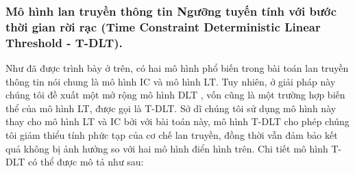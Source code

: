  		\subsubsection{Mô hình lan truyền thông tin Ngưỡng tuyến tính với bước thời gian rời rạc (Time Constraint Deterministic Linear Threshold - T-DLT).}
 		Như đã được trình bày ở trên, có hai mô hình phổ biến trong bài toán lan truyền thông tin nói chung là mô hình IC và mô hình LT. Tuy nhiên, ở giải pháp này chúng tôi đề xuất một mở rộng mô hình DLT \cite{zaixin}, vốn cũng là một trường hợp biến thể của mô hình LT, được gọi là T-DLT. Sở dĩ chúng tôi sử dụng mô hình này thay cho mô hình LT và IC bởi với bài toán này, mô hình T-DLT cho phép chúng tôi giảm thiểu tính phức tạp của cơ chế lan truyền, đồng thời vẫn đảm bảo kết quả không bị ảnh hưởng so với hai mô hình điển hình trên. Chi tiết mô hình T-DLT có thể được mô tả như sau:

